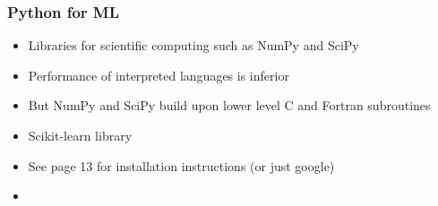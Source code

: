 \documentclass{beamer}
\begin{document}
\begin{frame}
  \frametitle{Python for ML}
  \begin{itemize}
  \item Libraries for scientific computing such as NumPy and SciPy
  \item Performance of interpreted languages is inferior
  \item But NumPy and SciPy build upon lower level C and Fortran subroutines
  \item Scikit-learn library
  \item See page 13 for installation instructions (or just google)
  \item \href{http://www-ekp.physik.uni-karlsruhe.de/~giffels/GridKa-School-Lectures/NumPy.slides.html}{}
  \end{itemize}
\end{frame}
\end{document}
